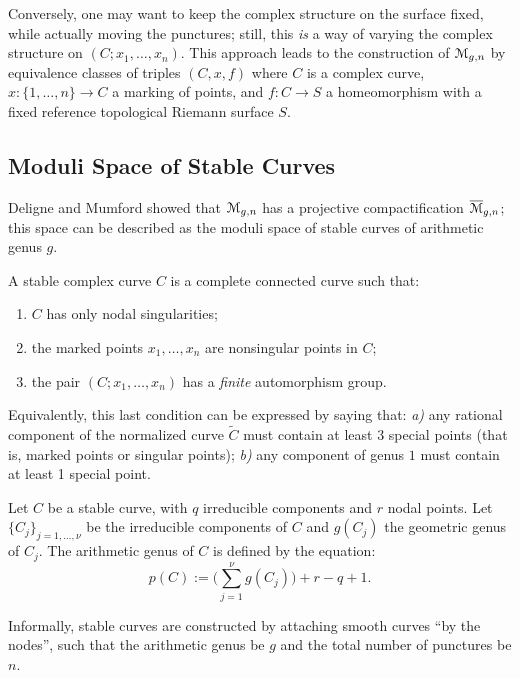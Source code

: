 Conversely, one may want to keep the complex structure on the surface
fixed, while actually moving the punctures; still, this \emph{is} a
way of varying the complex structure on $(C; x_1, \dots, x_n)$. This
approach leads to the construction of $\mathcal{M}_{g,n}$ by equivalence
classes of triples $(C, x, f)$ where $C$ is a complex curve, $x: \{1,
\ldots, n\} \longrightarrow C$ a marking of points, and $f: C \to S$ a homeomorphism with a
fixed reference topological Riemann surface $S$.


\subsection{Moduli Space of Stable Curves}
\label{sec:moduli-space-stable}

Deligne and Mumford \cite{deligne-mumford} showed that $\mathcal{M}_{g,n}$ has
a projective compactification $\overline{\mathcal{M}}_{g,n}$; this space can be
described as the moduli space of stable curves of arithmetic genus
$g$.
\begin{definition}
  A stable complex curve $C$ is a complete connected curve such that:
  \begin{enumerate}
  \item $C$ has only nodal singularities;
  \item the marked points $x_1, \ldots, x_n$ are nonsingular points in
    $C$;
  \item the pair $(C; x_1, \ldots, x_n)$ has a \emph{finite} automorphism
    group.
  \end{enumerate}
\end{definition}
Equivalently, this last condition can be expressed by saying that:
\textsl{a)} any rational component of the normalized curve $\tilde C$
must contain at least 3 special points (that is, marked points or
singular points); \textsl{b)} any component of genus $1$ must contain
at least 1 special point.

Let $C$ be a stable curve, with $q$ irreducible components and $r$
nodal points. Let $\{C_j\}_{j=1, \dots, \nu}$ be the irreducible
components of $C$ and $g(C_j)$ the geometric genus of $C_j$.  The
arithmetic genus of $C$ is defined by the equation:
\begin{equation*}
  p(C) := \bigl({\textstyle \sum_{j=1}^\nu} g(C_j) \bigr) + r - q + 1.
\end{equation*}

Informally, stable curves are constructed by attaching smooth curves
``by the nodes'', such that the arithmetic genus be $g$ and the total
number of punctures be $n$.



